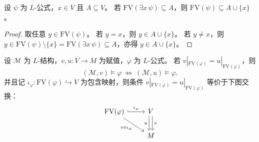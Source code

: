 \documentclass[lang=cn,a4paper,newtx,section]{elegantbook}
\begin{document}
\begin{remark}
\label{rem:fv-exists-subset}
设 $\psi$ 为 $L$-公式，$x\in V$ 且 $A\subseteq V$。
若 $\mathrm{FV}(\exists x\,\psi)\subseteq A$，则 $\mathrm{FV}(\psi)\subseteq A\cup\{x\}$。
\end{remark}

\begin{proof}
取任意 $y\in\mathrm{FV}(\psi)$。
若 $y=x$，则 $y\in A\cup\{x\}$。
若 $y\neq x$，则 $y\in\mathrm{FV}(\psi)\setminus\{x\}=\mathrm{FV}(\exists x\,\psi)\subseteq A$，亦得 $y\in A\cup\{x\}$。
\end{proof}

\begin{lemma}[满足关系只依赖自由变量]
\label{satisfaction-depends-on-free-vars}
设 $\mathcal M$ 为 $L$-结构，$v,u:V\to M$ 为赋值，$\varphi$ 为 $L$-公式。
若 $v|_{\mathrm{FV}(\varphi)}=u|_{\mathrm{FV}(\varphi)}$，则
\[
  (\mathcal M,v)\models\varphi\ \Longleftrightarrow\ (\mathcal M,u)\models\varphi.
\]
并且记 $\iota_{\varphi}:\mathrm{FV}(\varphi)\hookrightarrow V$ 为包含映射，则条件 $v|_{\mathrm{FV}(\varphi)}=u|_{\mathrm{FV}(\varphi)}$ 等价于下图交换：
\[
\begin{tikzcd}
\mathrm{FV}(\varphi) \arrow[r, hook, "\iota_{\varphi}"] \arrow[dr, "v\circ\iota_{\varphi}"'] & V \arrow[d, shift left, "v"] \arrow[d, shift right, "u"'] \\
& M
\end{tikzcd}
\]
\end{lemma}
\end{document}
